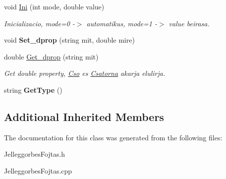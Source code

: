 \begin{DoxyCompactItemize}
\mbox{\label{class_jelleggorbes_fojtas_a6e095b972116dd9b3dd0635dbbd4edb9}} 
void \hyperlink{class_jelleggorbes_fojtas_a6e095b972116dd9b3dd0635dbbd4edb9}{Ini} (int mode, double value)
\begin{DoxyCompactList}\small\item\em Inicializacio, mode=0 -\/$>$ automatikus, mode=1 -\/$>$ value beirasa. \end{DoxyCompactList}\item 
\mbox{\label{class_jelleggorbes_fojtas_a1af41ea01aa004c5c709fed5760f1de1}} 
void {\bfseries Set\+\_\+dprop} (string mit, double mire)
\item 
\mbox{\label{class_jelleggorbes_fojtas_ab5e5487da5f674affde45438021c0967}} 
double \hyperlink{class_jelleggorbes_fojtas_ab5e5487da5f674affde45438021c0967}{Get\+\_\+dprop} (string mit)
\begin{DoxyCompactList}\small\item\em Get double property, \hyperlink{class_cso}{Cso} es \hyperlink{class_csatorna}{Csatorna} akarja elulirja. \end{DoxyCompactList}\item 
\mbox{\label{class_jelleggorbes_fojtas_a99692fcbf4be938803671901230f11ae}} 
string {\bfseries Get\+Type} ()
\end{DoxyCompactItemize}
\subsection*{Additional Inherited Members}


The documentation for this class was generated from the following files\+:\begin{DoxyCompactItemize}
\item 
Jelleggorbes\+Fojtas.\+h\item 
Jelleggorbes\+Fojtas.\+cpp\end{DoxyCompactItemize}
